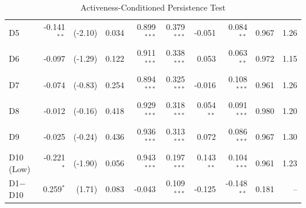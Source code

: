 \begin{table}[!htbp]
{\begin{tabular*}{\linewidth}{@{\extracolsep{\fill}}lrrrrrrrrr}
\hspace{1em}D5 & -0.141$^{**}$ & (-2.10) & 0.034 & 0.899$^{***}$ & 0.379$^{***}$ & -0.051 & 0.084$^{**}$ & 0.967 & 1.26\\
\hspace{1em}D6 & -0.097 & (-1.29) & 0.122 & 0.911$^{***}$ & 0.338$^{***}$ & 0.053 & 0.063$^{**}$ & 0.972 & 1.15\\
\hspace{1em}D7 & -0.074 & (-0.83) & 0.254 & 0.894$^{***}$ & 0.325$^{***}$ & -0.016 & 0.108$^{***}$ & 0.961 & 1.26\\
\hspace{1em}D8 & -0.012 & (-0.16) & 0.418 & 0.929$^{***}$ & 0.318$^{***}$ & 0.054$^{**}$ & 0.091$^{***}$ & 0.980 & 1.20\\
\hspace{1em}D9 & -0.025 & (-0.24) & 0.436 & 0.936$^{***}$ & 0.313$^{***}$ & 0.072 & 0.086$^{***}$ & 0.967 & 1.30\\
\hspace{1em}D10 (Low) & -0.221$^{*}$ & (-1.90) & 0.056 & 0.943$^{***}$ & 0.197$^{***}$ & 0.143$^{**}$ & 0.104$^{***}$ & 0.961 & 1.23\\
\hspace{1em}D1$-$D10 & 0.259$^{*}$ & (1.71) & 0.083 & -0.043 & 0.109$^{***}$ & -0.125 & -0.148$^{**}$ & 0.181 & --\\
\bottomrule
\end{tabular*}%
}\sbefit
\fi
\setlength{\tabletempwidth}{\wd\tabletempbox}
\ifdim\tabletempwidth>\linewidth\setlength{\tabletempwidth}{\linewidth}\fi
\begin{minipage}{\tabletempwidth}
\captionsetup{width=\linewidth}
\caption{Activeness-Conditioned Persistence Test}\label{tab:activeness_persistence}
\ifdim\wd\tabletempbox>\linewidth
  \resizebox{\linewidth}{!}{\usebox{\tabletempbox}}
\else
  \usebox{\tabletempbox}
\fi
\par\medskip
\begin{singlespace}\tablefont\noindent

\end{singlespace}
\end{minipage}
\end{table}
